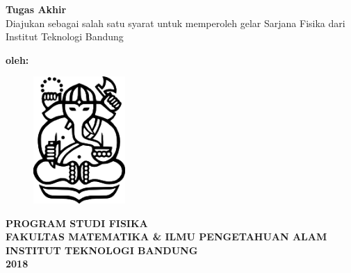 \clearpage
\thispagestyle{empty}

\begin{center}
\smallskip
	\Large\textbf{\thetitle}

	\vspace{2cm}
	\normalsize
	\textbf{Tugas Akhir} \\
	Diajukan sebagai salah satu syarat untuk memperoleh gelar Sarjana Fisika dari Institut Teknologi Bandung

	\vspace{1cm}
	\textbf{oleh:}\\
	\textbf{\theauthor}

	\vspace{1cm}
	\begin{figure}[!htbp]
		\centering
		\includegraphics[width=3.5cm]{resources/itb_logo.png}
		\label{cover}
	\end{figure}

	\vspace{2cm}
	\textbf{PROGRAM STUDI FISIKA \\
	FAKULTAS MATEMATIKA \& ILMU PENGETAHUAN ALAM \\
	INSTITUT TEKNOLOGI BANDUNG \\
	2018 \\}

\end{center}
\clearpage